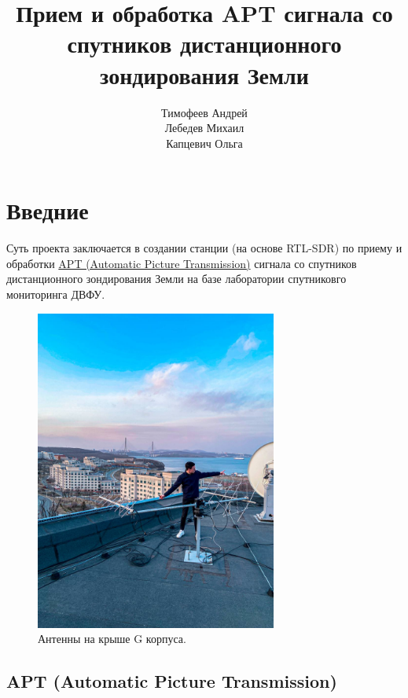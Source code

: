 \documentclass[a4paper, 14pt, titlepage, fleqn]{extarticle}
\begin{document}
	\title{\textbf{Прием и обработка APT сигнала со спутников дистанционного зондирования Земли}}
	\author{Тимофеев Андрей \\ Лебедев Михаил \\ Капцевич Ольга}
	\maketitle
	
	\tableofcontents
	\pagebreak

	\section*{Введние}
	
	Суть проекта заключается в создании станции (на основе RTL-SDR) по приему и обработки \href{https://en.wikipedia.org/wiki/Automatic_picture_transmission}{APT (Automatic Picture Transmission)} сигнала со спутников дистанционного зондирования Земли на базе лаборатории спутниковго мониторинга ДВФУ. \\
	
	\begin{figure}[H]
		\centering
		\includegraphics[width=300px]{antenna.jpg}
		\caption{Антенны на крыше G корпуса.}
	\end{figure}
	
	\subsection*{APT (Automatic Picture Transmission)}
	
\end{document}

